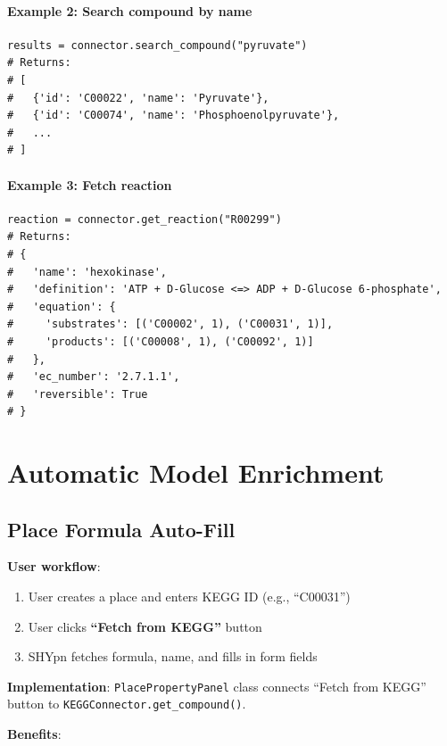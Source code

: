 \paragraph{Example 2: Search compound by name}

\begin{verbatim}
results = connector.search_compound("pyruvate")
# Returns:
# [
#   {'id': 'C00022', 'name': 'Pyruvate'},
#   {'id': 'C00074', 'name': 'Phosphoenolpyruvate'},
#   ...
# ]
\end{verbatim}

\paragraph{Example 3: Fetch reaction}

\begin{verbatim}
reaction = connector.get_reaction("R00299")
# Returns:
# {
#   'name': 'hexokinase',
#   'definition': 'ATP + D-Glucose <=> ADP + D-Glucose 6-phosphate',
#   'equation': {
#     'substrates': [('C00002', 1), ('C00031', 1)],
#     'products': [('C00008', 1), ('C00092', 1)]
#   },
#   'ec_number': '2.7.1.1',
#   'reversible': True
# }
\end{verbatim}

\section{Automatic Model Enrichment}
\label{sec:model-enrichment}

\subsection{Place Formula Auto-Fill}
\label{subsec:place-formula-autofill}

\textbf{User workflow}:

\begin{enumerate}
    \item User creates a place and enters KEGG ID (e.g., ``C00031'')
    \item User clicks \textbf{``Fetch from KEGG''} button
    \item SHYpn fetches formula, name, and fills in form fields
\end{enumerate}

\textbf{Implementation}: \texttt{PlacePropertyPanel} class connects ``Fetch from KEGG'' button to \texttt{KEGGConnector.get\_compound()}.

\textbf{Benefits}:

